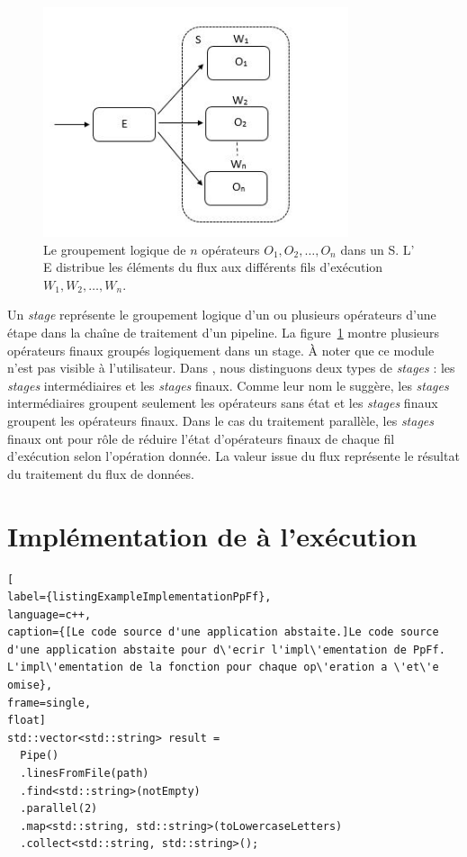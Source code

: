 \begin{figure}[ht]
\centering
     \includegraphics[width=0.8\textwidth]{Figures/Stages.jpg}
      \caption[Le groupement logique de $n$ op\'erateurs $O_1, O_2, \ldots, O_n$ dans un  S.]{Le groupement logique de $n$ op\'erateurs $O_1, O_2, \ldots, O_n$ dans un  S.  L' E distribue les \'el\'ements du flux aux diff\'erents fils d'ex\'ecution $W_1, W_2, \ldots, W_n$.}
       \label{Stages.fig}
\end{figure}

Un \emph{stage} repr\'esente le groupement logique d'un ou plusieurs op\'erateurs d'une \'etape dans la cha\^ine de traitement d'un pipeline. La figure~\ref{Stages.fig} montre plusieurs op\'erateurs finaux group\'es logiquement dans un stage.  \`A noter que ce module n'est pas visible \`a l'utilisateur. Dans , nous distinguons deux types de \emph{stages} : les \emph{stages} interm\'ediaires et les \emph{stages} finaux. Comme leur nom le sugg\`ere, les \emph{stages} interm\'ediaires groupent seulement les op\'erateurs sans \'etat et les \emph{stages} finaux groupent les op\'erateurs finaux. Dans le cas du traitement parall\`ele, les \emph{stages} finaux ont pour r\^ole de r\'eduire l'\'etat d'op\'erateurs finaux de chaque fil d'ex\'ecution selon l'op\'eration donn\'ee. La valeur issue du flux repr\'esente le r\'esultat du traitement du flux de donn\'ees.



\section{Impl\'ementation de  \`a l'ex\'ecution}

\begin{lstlisting}[
label={listingExampleImplementationPpFf},
language=c++,
caption={[Le code source d'une application abstaite.]Le code source d'une application abstaite pour d\'ecrir l'impl\'ementation de PpFf. L'impl\'ementation de la fonction pour chaque op\'eration a \'et\'e omise},
frame=single,
float]
std::vector<std::string> result = 
  Pipe()
  .linesFromFile(path) 
  .find<std::string>(notEmpty)
  .parallel(2)
  .map<std::string, std::string>(toLowercaseLetters)
  .collect<std::string, std::string>();
\end{lstlisting}


